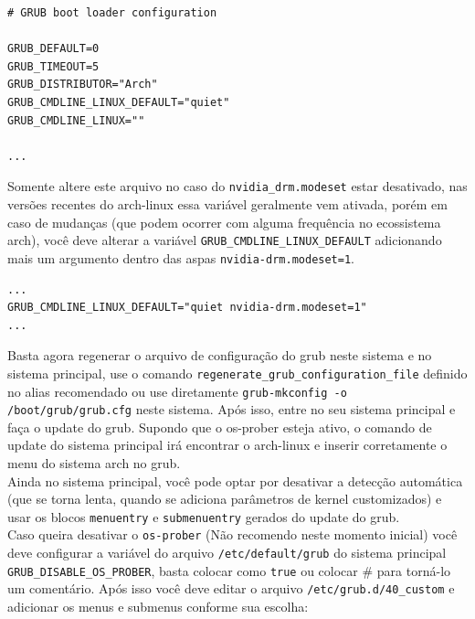\documentclass[12pt,a4paper]{article}
\begin{document}
\begin{lstlisting}
# GRUB boot loader configuration

GRUB_DEFAULT=0
GRUB_TIMEOUT=5
GRUB_DISTRIBUTOR="Arch"
GRUB_CMDLINE_LINUX_DEFAULT="quiet"
GRUB_CMDLINE_LINUX=""

...
\end{lstlisting}

\vspace{\baselineskip}

Somente altere este arquivo no caso do \texttt{nvidia\_drm.modeset} estar desativado, nas versões recentes do arch-linux essa variável geralmente vem ativada, porém em caso de mudanças (que podem ocorrer com alguma frequência no ecossistema arch), você deve alterar a variável \texttt{GRUB\_CMDLINE\_LINUX\_DEFAULT} adicionando mais um argumento dentro das aspas \texttt{nvidia-drm.modeset=1}.

\begin{lstlisting}
...
GRUB_CMDLINE_LINUX_DEFAULT="quiet nvidia-drm.modeset=1"
...
\end{lstlisting}

\vspace{\baselineskip}

Basta agora regenerar o arquivo de configuração do grub neste sistema e no sistema principal, use o comando  \texttt{regenerate\_grub\_configuration\_file} definido no alias recomendado ou use diretamente \texttt{grub-mkconfig -o /boot/grub/grub.cfg} neste sistema. Após isso, entre no seu sistema principal e faça o update do grub. Supondo que o os-prober esteja ativo, o comando de update do sistema principal irá encontrar o arch-linux e inserir corretamente o menu do sistema arch no grub.\\

Ainda no sistema principal, você pode optar por desativar a detecção automática (que se torna lenta, quando se adiciona parâmetros de kernel customizados) e usar os blocos \texttt{menuentry} e \texttt{submenuentry} gerados do update do grub. \\

Caso queira desativar o \texttt{os-prober} (Não recomendo neste momento inicial) você deve configurar a variável do arquivo \texttt{/etc/default/grub} do sistema principal \texttt{GRUB\_DISABLE\_OS\_PROBER}, basta colocar como \texttt{true} ou colocar \# para torná-lo um comentário. Após isso você deve editar o arquivo \texttt{/etc/grub.d/40\_custom} e adicionar os menus e submenus conforme sua escolha:\\
\end{document}
